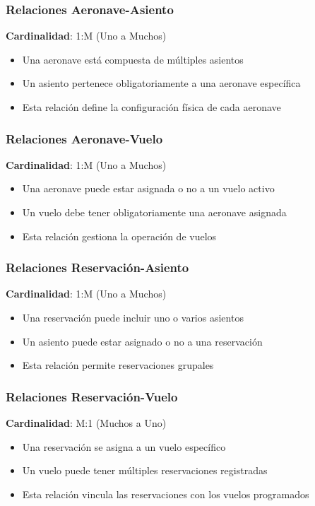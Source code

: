 \documentclass[12pt,a4paper]{article}
\begin{document}
\subsubsection{Relaciones Aeronave-Asiento}
\textbf{Cardinalidad}: 1:M (Uno a Muchos)
\begin{itemize}
    \item Una aeronave está compuesta de múltiples asientos
    \item Un asiento pertenece obligatoriamente a una aeronave específica
    \item Esta relación define la configuración física de cada aeronave
\end{itemize}

\subsubsection{Relaciones Aeronave-Vuelo}
\textbf{Cardinalidad}: 1:M (Uno a Muchos)
\begin{itemize}
    \item Una aeronave puede estar asignada o no a un vuelo activo
    \item Un vuelo debe tener obligatoriamente una aeronave asignada
    \item Esta relación gestiona la operación de vuelos
\end{itemize}

\subsubsection{Relaciones Reservación-Asiento}
\textbf{Cardinalidad}: 1:M (Uno a Muchos)
\begin{itemize}
    \item Una reservación puede incluir uno o varios asientos
    \item Un asiento puede estar asignado o no a una reservación
    \item Esta relación permite reservaciones grupales
\end{itemize}

\subsubsection{Relaciones Reservación-Vuelo}
\textbf{Cardinalidad}: M:1 (Muchos a Uno)
\begin{itemize}
    \item Una reservación se asigna a un vuelo específico
    \item Un vuelo puede tener múltiples reservaciones registradas
    \item Esta relación vincula las reservaciones con los vuelos programados
\end{itemize}
\end{document}
